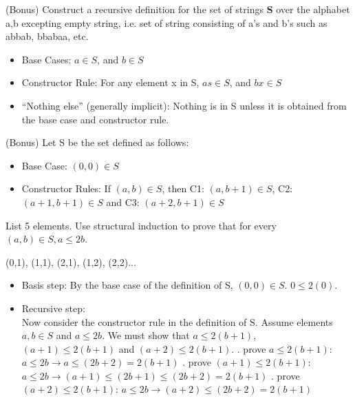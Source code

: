 \documentclass[solution, letterpaper]{cs20inclass}
\begin{document}
\problem (Bonus) Construct a recursive definition for the set of strings \textbf{S} over the alphabet a,b excepting empty string, i.e. set of string consisting of a's and b's such as abbab, bbabaa, etc.

\begin{solution}
\begin{itemize}
\item Base Cases:  $a\in S$, and $b \in S$
\item Constructor Rule: For any element x in S, $as \in S$, and $bx \in S$
\item “Nothing else” (generally implicit): Nothing is in S unless it is obtained from the base case and constructor rule.
\end{itemize}
\end{solution}

\problem (Bonus) Let S be the set defined as follows:
\begin{itemize}
\item Base Case: $(0,0) \in S$
\item Constructor Rules: If $(a,b)\in S$, then C1: $(a, b+1) \in S$, C2: $(a+1,b+1)\in S$ and C3: $(a+2, b+1)\in S$ 
\end{itemize}
\subproblem List 5 elements.
\subproblem Use structural induction to prove that for every $(a,b)\in S, a\leq 2b$.

\begin{solution}
\subsolution (0,1), (1,1), (2,1), (1,2), (2,2)...
\subsolution
\begin{itemize}
\item Basis step: By the base case of the definition of S, $(0,0)\in S$. $0\leq2(0)$.
\item Recursive step: \\
Now consider the constructor rule in the definition of S. Assume elements $a,b\in S$ and $ a\leq 2b$. We must  show that $a\leq2(b+1)$, $(a+1)\leq2(b+1)$ and $(a+2)\leq2(b+1)$.
. prove $a\leq2(b+1)$:  $a\leq2b\rightarrow a\leq(2b+2)=2(b+1)$
. prove $(a+1)\leq2(b+1)$: $a\leq2b \rightarrow (a+1)\leq(2b+1)\leq(2b+2)=2(b+1)$
. prove $(a+2)\leq2(b+1)$:  $a\leq2b \rightarrow (a+2)\leq(2b+2)=2(b+1)$
\end{itemize}
\end{solution}
\end{document}
